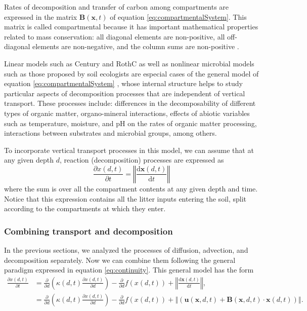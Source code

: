 \documentclass[11pt, oneside, a4paper]{article}   	%
\begin{document}
Rates of decomposition and transfer of carbon among compartments are expressed in the matrix $\mathbf{B}(\bm{x}, t)$ of equation \ref{eq:compartmentalSystem}. This matrix is called compartmental because it has important mathematical properties related to mass conservation: all diagonal elements are non-positive, all off-diagonal elements are non-negative, and the column sums are non-positive \citep{Metzler2018MG, Sierra2018JAMES}.

Linear models such as Century and RothC as well as nonlinear microbial models such as those proposed by soil ecologists \citep[e.g][]{Schimel2003, Allison2010} are especial cases of the general model of equation \ref{eq:compartmentalSystem} \citep{Sierra2015EM}, whose internal structure helps to study particular aspects of decomposition processes that are independent of vertical transport. These processes include: differences in the decomposability of different types of organic matter, organo-mineral interactions, effects of abiotic variables such as temperature, moisture, and pH on the rates of organic matter processing, interactions between substrates and microbial groups, among others. 

To incorporate vertical transport processes in this model, we can assume that at any given depth $d$, reaction (decomposition) processes are expressed as
\begin{equation}
\frac{\partial x(d, t)}{\partial t} = \left\Vert \frac{\mathrm{d} \bm{x}(d, t)}{\mathrm{d} t} \right\Vert
\end{equation}
where the sum is over all the compartment contents at any given depth and time. Notice that this expression contains all the litter inputs entering the soil, split according to the compartments at which they enter. 

\subsubsection{Combining transport and decomposition}
In the previous sections, we analyzed the processes of diffusion, advection, and decomposition separately. Now we can combine them following the general paradigm expressed in equation \ref{eq:continuity}. This general model has the form
\begin{equation} \label{eq:generalTransport}
\begin{aligned}
\frac{\partial x(d, t)}{\partial t} &= \frac{\partial}{\partial d} \left( \kappa(d, t) \frac{\partial x(d, t)}{\partial d} \right) 
                                                  - \frac{\partial }{\partial d} f(x(d, t))
                                                  + \left\Vert \frac{\mathrm{d} \bm{x}(d, t)}{\mathrm{d} t} \right\Vert, \\
 &=  \frac{\partial}{\partial d} \left( \kappa(d, t) \frac{\partial x(d, t)}{\partial d} \right) 
                                                  - \frac{\partial }{\partial d} f(x(d, t))
                                                  + \left\Vert \left( \bm{u}(\bm{x}, d, t) + \mathbf{B}(\bm{x}, d, t) \cdot \bm{x}(d, t)  \right) \right\Vert.
\end{aligned}
\end{equation}
\end{document}
